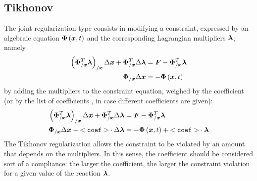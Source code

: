 \subsection{Tikhonov}
The  joint regularization type consists in modifying
a constraint, expressed by an algebraic equation $\boldsymbol{\Phi}\left( \boldsymbol{x}, t \right)$
and the corresponding Lagrangian multipliers $\boldsymbol{\lambda}$, namely
\begin{align}
	\left( \boldsymbol{\Phi}_{/\boldsymbol{x}}^T \boldsymbol{\lambda} \right)_{/\boldsymbol{x}} \Delta\boldsymbol{x}
	+ \boldsymbol{\Phi}_{/\boldsymbol{x}}^T \Delta\boldsymbol{\lambda}
		&= \boldsymbol{F} - \boldsymbol{\Phi}_{/\boldsymbol{x}}^T \boldsymbol{\lambda} \\
	\boldsymbol{\Phi}_{/\boldsymbol{x}} \Delta\boldsymbol{x} &= - \boldsymbol{\Phi}\left( \boldsymbol{x}, t \right)
\end{align}
by adding the multipliers to the constraint equation,
weighed by the coefficient  (or by the list of coefficients
, in case different coefficients are given):
\begin{align}
	\left( \boldsymbol{\Phi}_{/\boldsymbol{x}}^T \boldsymbol{\lambda} \right)_{/\boldsymbol{x}} \Delta\boldsymbol{x}
	+ \boldsymbol{\Phi}_{/\boldsymbol{x}}^T \Delta\boldsymbol{\lambda}
	&= \boldsymbol{F} - \boldsymbol{\Phi}_{/\boldsymbol{x}}^T \boldsymbol{\lambda} \\
	\boldsymbol{\Phi}_{/\boldsymbol{x}} \Delta\boldsymbol{x}
	- \mathtt{<coef>} \cdot \Delta\boldsymbol{\lambda}
	&= - \boldsymbol{\Phi}\left( \boldsymbol{x}, t \right) + \mathtt{<coef>} \cdot \boldsymbol{\lambda}
\end{align}
The Tikhonov regularization allows the constraint to be violated
by an amount that depends on the multipliers.
In this sense, the coefficient  should be considered
sort of a compliance: the larger the coefficient,
the larger the constraint violation for a given value
of the reaction $\boldsymbol{\lambda}$.

